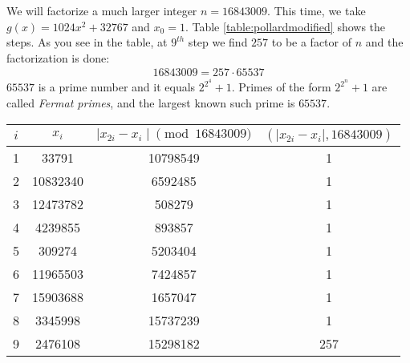 \begin{example}
	We will factorize a much larger integer $n=16843009$. This time, we take $g(x)=1024x^2+32767$ and $x_0=1$. Table \ref{table:pollardmodified} shows the steps. As you see in the table, at $9^{th}$ step we find $257$ to be a factor of $n$ and the factorization is done:
		\begin{align*}
			16843009 = 257 \cdot 65537
		\end{align*}
	$65537$ is a prime number and it equals $2^{2^{4}}+1$. Primes of the form $2^{2^n}+1$ are called \textit{Fermat primes}, and the largest known such prime is $65537$.
	\begin{table}
			\centering
			\begin{tabular}{|c|c|c|c|}
				\hline
				$i$ & $x_i$ & $\mid x_{2i}-x_i\mid  \pmod{16843009}$ & $(\mid x_{2i}-x_i\mid , 16843009)$ \\
				\hline
				1 & 33791 & 10798549 & 1 \\
				\hline
				2 & 10832340 & 6592485 & 1 \\
				\hline
				3 & 12473782 & 508279 & 1 \\
				\hline
				4 & 4239855 & 893857 & 1 \\
				\hline
				5 & 309274 & 5203404 & 1 \\
				\hline
				6 & 11965503 & 7424857 & 1 \\
				\hline
				7 & 15903688 & 1657047 & 1 \\
				\hline
				8 & 3345998 & 15737239 & 1 \\
				\hline
				9 & 2476108 & 15298182 & 257 \\

\end{tabular}
\end{table}
\end{example}
